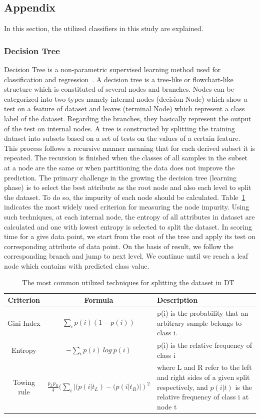 \subsection{Appendix} \label{sec:appendix}
In this section, the utilized classifiers in this study are explained.

\subsubsection{Decision Tree}
Decision Tree is a non-parametric supervised learning method used for classification and regression~\citep{duda2012pattern}. A decision tree is a tree-like or flowchart-like structure which is constituted of several nodes and branches. Nodes can be categorized into two types namely internal nodes (decision Node) which show a test on a feature of dataset and leaves (terminal Node) which represent a class label of the dataset. Regarding the branches, they basically represent the output of the test on internal nodes. A tree is constructed by splitting the training dataset into subsets based on a set of tests on the values of a certain feature. This process follows a recursive manner meaning that for each derived subset it is repeated. The recursion is finished when the classes of all samples in the subset at a node are the same or when partitioning the data does not improve the prediction. The primary challenge in the growing the decision tree (learning phase) is to select the best attribute as the root node and also each level to split the dataset. To do so, the impurity of each node should be calculated. Table~\ref{tab:dt_criterion} indicates the most widely used criterion for measuring the node impurity. Using such techniques, at each internal node, the entropy of all attributes in dataset are calculated and one with lowest entropy is selected to split the dataset. In scoring time for a give data point, we start from the root of the tree and apply its test on corresponding attribute of data point. On the basis of result, we follow the corresponding branch and jump to next level. We continue until we reach a leaf node which contains with predicted class value.   


\begin{table}[h]
    \centering
\begin{tabular}{|c|c|>{\centering}m{5cm}|}
\hline 
Criterion & Formula &Description \tabularnewline
\hline 
\hline 
Gini Index & $\sum_{i} p(i)(1-p(i))$ & p(i) is the probability
that an arbitrary
sample belongs to
class i.\tabularnewline
\hline 
Entropy & $-\sum_{i} p(i)~log~p(i)$ & p(i) is the relative frequency of class i\tabularnewline
\hline 
Towing rule & $\frac{p_{L} p_{R}}{4}(\sum_{i}|(p(i|t_L) - (p(i|t_R)|)^2$ & where L and R
refer to the left and right sides of a given split respectively, and 
$p(i|t)$ is the relative frequency of class i at node t \tabularnewline
\hline 
\end{tabular}
    \caption{The most common utilized techniques for splitting the dataset in DT~\citep{zambon2006effect} }
    \label{tab:dt_criterion}
\end{table}


